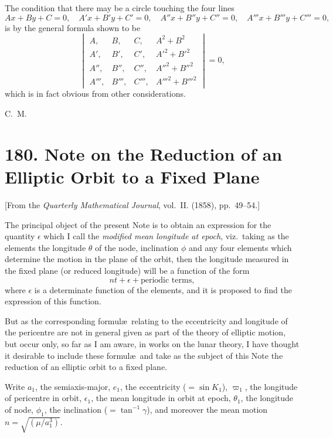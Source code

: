 \documentclass[11pt,a4paper]{book}
\begin{document}
The condition that there may be a circle touching the four lines
\[
Ax + By + C = 0, \quad A'x + B'y + C' = 0, \quad A''x + B''y + C'' = 0, \quad A'''x + B'''y + C''' = 0,
\]
is by the general formula shown to be
\[
\begin{vmatrix}
A, & B, & C, & A^2 + B^2 \\
A', & B', & C', & A'^2 + B'^2 \\
A'', & B'', & C'', & A''^2 + B''^2 \\
A''', & B''', & C''', & A'''^2 + B'''^2
\end{vmatrix} = 0,
\]
which is in fact obvious from other considerations.

\begin{flushright}
C.~M.
\end{flushright}


\newpage
\section*{180. Note on the Reduction of an Elliptic Orbit to a Fixed Plane}

[From the \textit{Quarterly Mathematical Journal}, vol.~II. (1858), pp.~49--54.]

The principal object of the present Note is to obtain an expression for the quantity $\epsilon$ which I call the \textit{modified mean longitude at epoch}, viz.\ taking as the elements the longitude $\theta$ of the node, inclination $\phi$ and any four elements which determine the motion in the plane of the orbit, then the longitude measured in the fixed plane (or reduced longitude) will be a function of the form
\[
nt + \epsilon + \text{periodic terms},
\]
where $\epsilon$ is a determinate function of the elements, and it is proposed to find the expression of this function.

But as the corresponding formul\ae\ relating to the eccentricity and longitude of the pericentre are not in general given as part of the theory of elliptic motion, but occur only, so far as I am aware, in works on the lunar theory, I have thought it desirable to include these formul\ae\ and take as the subject of this Note the reduction of an elliptic orbit to a fixed plane.

Write $a_1$, the semiaxis-major, $e_1$, the eccentricity ($= \sin K_1$), $\varpi_1$, the longitude of pericentre in orbit, $\epsilon_1$, the mean longitude in orbit at epoch, $\theta_1$, the longitude of node, $\phi_1$, the inclination ($= \tan^{-1} \gamma$), and moreover the mean motion $n = \sqrt{(\mu / a_1^3)}$.
\end{document}
